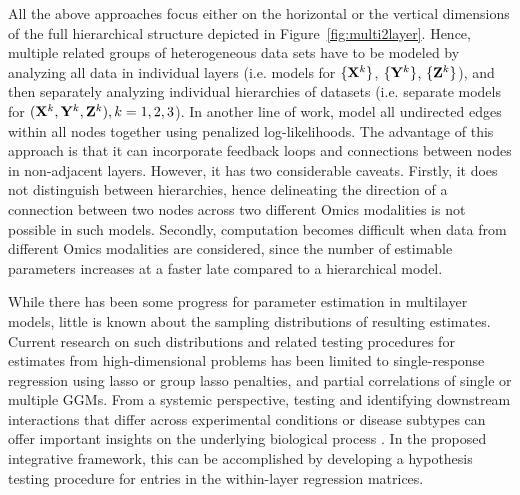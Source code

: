 All the above approaches focus either on the horizontal or the vertical dimensions of the full hierarchical structure depicted in Figure~\ref{fig:multi2layer}. Hence, multiple related groups of heterogeneous data sets have to be modeled by analyzing all data in individual layers (i.e. models for $\{ {\mathbf{X}}^k \}$, $\{ {\mathbf{Y}}^k \}$, $\{ {\mathbf{Z}}^k \}$), and then separately analyzing individual hierarchies of datasets (i.e. separate models for $({\mathbf{X}}^k, {\mathbf{Y}}^k, {\mathbf{Z}}^k), k = 1,2,3$). In another line of work, \citet{KlingEtal15,ZhangOuyangZhao17} model all undirected edges within all nodes together using penalized log-likelihoods. The advantage of this approach is that it can incorporate feedback loops and connections between nodes in non-adjacent layers. However, it has two considerable caveats. Firstly, it does not distinguish between hierarchies, hence delineating the direction of a connection between two nodes across two
different Omics modalities is not possible in such models. Secondly, computation becomes difficult when data from different Omics modalities are considered, since the number of estimable parameters increases at a faster late compared to a hierarchical model.%

While there has been some progress for parameter estimation in multilayer models, little is known about the sampling distributions of resulting estimates. Current research on such distributions and related testing procedures for estimates from high-dimensional problems has been limited to single-response regression using lasso \citep{ZhangZhang14,JavanmardMontanari14,JavanmardMontanari18,vanDeGeerEtal14} or group lasso \citep{MitraZhang16} penalties, and partial correlations of single \citep{CaiLiu16} or multiple \citep{BelilovskyEtal16,Liu17} GGMs. From a systemic perspective, testing and identifying downstream interactions that differ across experimental conditions or disease subtypes can offer important insights on the underlying biological process \citep{MaoEtal17,LiEtal15}. In the proposed integrative framework, this can be accomplished by developing a hypothesis testing procedure for entries in the within-layer regression matrices.

